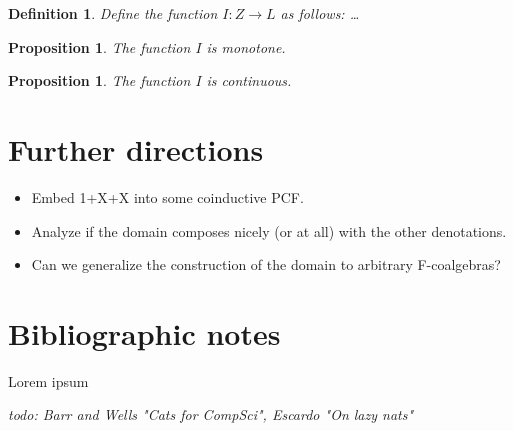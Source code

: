 \documentclass[a4paper]{article}
\newcommand{\arr}{\rightarrow}
\newcommand{\todo}[1]{\bigskip \noindent \emph{todo: #1}}
\newtheorem{defIMapsNuFToL}[defNuF]{Definition}
\newtheorem{thmIIsMonotone}[defNuF]{Proposition}
\newtheorem{thmIIsContinuous}[defNuF]{Proposition}
\begin{document}
\begin{defIMapsNuFToL}

Define the function $I : Z \arr L$ as follows: \ldots

\end{defIMapsNuFToL}


\begin{thmIIsMonotone}

The function $I$ is monotone.

\end{thmIIsMonotone}


\begin{thmIIsContinuous}

The function $I$ is continuous.

\end{thmIIsContinuous}

\section{Further directions}

\begin{itemize}
\item Embed 1+X+X into some coinductive PCF.
\item Analyze if the domain composes nicely (or at all) with the other
denotations.
\item Can we generalize the construction of the domain to arbitrary
F-coalgebras?
\end{itemize}

\section{Bibliographic notes}

Lorem ipsum \cite{Pierce1991} \cite{Gunter1992} \cite{Bird1997}
\cite{Mitchell1996} \cite{Allison1986} \cite{Capretta2002}

\todo{Barr and Wells "Cats for CompSci", Escardo "On lazy nats"}



\end{document}
